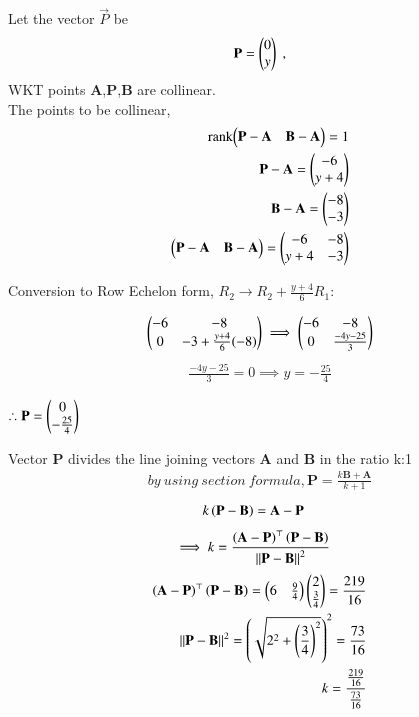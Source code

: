 \documentclass[journal]{IEEEtran}
\begin{document}
Let the vector $\vec{P}$ be 
\begin{align}
    \vec{P}=\begin{myvec}{0\\y}\end{myvec} \;, 
\end{align}
WKT points \textbf{A},\textbf{P},\textbf{B} are collinear.\\
The points to be collinear,
\begin{align}
	\label{eq:line-rank-2}
	\text{rank}{\ensuremath{\begin{pmatrix}\mathbf{P}-\mathbf{A}& \mathbf{B}-\mathbf{A}\end{pmatrix}}} = 1\\
        \mathbf{P}-\mathbf{A} = \begin{pmatrix}-6\\y+4\end{pmatrix}\\
         \mathbf{B}-\mathbf{A} = \begin{pmatrix}-8\\-3\end{pmatrix}\\
        \begin{pmatrix}\mathbf{P}-\mathbf{A}& \mathbf{B}-\mathbf{A}\end{pmatrix} = \begin{pmatrix}-6 & -8\\ y+4&-3 \end{pmatrix}
      \end{align}
 \begin{center}
 Conversion to Row Echelon form,
 $R_2 \rightarrow R_2 + \frac{y+4}{6}R_1 :$\\
\end{center}
\begin{align}
\begin{pmatrix} -6 & -8\\0 & -3+ \frac{y+4}{6}(-8)\end{pmatrix}\implies
\begin{pmatrix}-6 & -8\\0 & \frac{-4y-25}{3}\end{pmatrix}\\
\end{align}
 \begin{align}
  \frac{-4y-25}{3}=0\implies y=-\frac{25}{4}
 \end{align}
 \begin{center}
      $\therefore \vec{P}=\begin{myvec}{0\\-\frac{25}{4}}\end{myvec}$
 \end{center}
Vector \textbf{P} divides the line joining vectors \textbf{A} and \textbf{B} in the ratio k:1
\begin{align}
    by\ using \ section\ formula,
    \textbf{P}=\frac{k\textbf{B}+\textbf{A}}{k+1}
\end{align}
 \begin{align}
			k\left(\mathbf{P}-\mathbf{B}\right)&= \mathbf{A}-\mathbf{P}
\end{align}
\begin{align}
    \implies k &=
		\frac{\left(\mathbf{A}-\mathbf{P}\right)^{\top}\left(\mathbf{P}-\mathbf{B}\right)}{\left\lVert\mathbf{P}-\mathbf{B}\right\rVert^2}
			\label{eq:section_formula-k}
\end{align}
\begin{align}
\left(\mathbf{A}-\mathbf{P}\right)^{\top}\left(\mathbf{P}-\mathbf{B}\right) = \begin{pmatrix}6 & \frac{9}{4}\end{pmatrix}\begin{pmatrix}2\\ \frac{3}{4}
\end{pmatrix}=\frac{219}{16}\\
{\left\lVert\mathbf{P}-\mathbf{B}\right\rVert^2} = \left(\sqrt{2^2 + {\left(\frac{3}{4}\right)}^2}\right)^2 = \frac{73}{16}\\
k=\frac{\frac{219}{16}}{\frac{73}{16}}
\end{align}
\end{document}
